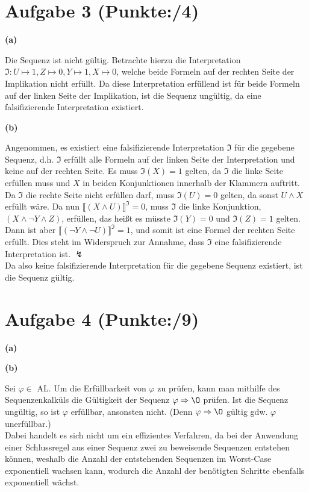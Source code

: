 \documentclass[11pt, a4paper]{article}
\newcommand{\pp}{4}
\newcommand{\ppp}{9}
\begin{document}
\section*{Aufgabe 3 (Punkte:\qquad/\pp)}
\textbf{(a)}
\begin{adjustwidth}{20pt}{20pt}
Die Sequenz ist nicht gültig. Betrachte hierzu die Interpretation $\mathfrak{I}:U \mapsto 1,Z \mapsto 0, Y \mapsto 1, X \mapsto 0$, welche beide Formeln auf der rechten Seite
der Implikation nicht erfüllt. Da diese Interpretation erfüllend ist für beide Formeln auf der linken Seite der Implikation, ist die Sequenz ungültig, da eine falsifizierende Interpretation
existiert.
\end{adjustwidth}
\textbf{(b)}
\begin{adjustwidth}{20pt}{20pt}
Angenommen, es existiert eine falsifizierende Interpretation $\mathfrak{I}$ für die gegebene Sequenz, d.h. $\mathfrak{I}$ erfüllt alle Formeln auf der linken Seite der Interpretation
und keine auf der rechten Seite. Es muss $\mathfrak{I}(X)=1$ gelten, da $\mathfrak{I}$ die linke Seite erfüllen muss und $X$ in beiden Konjunktionen innerhalb der Klammern auftritt.
Da $\mathfrak{I}$ die rechte Seite nicht erfüllen darf, muss $\mathfrak{I}(U)=0$ gelten, da sonst $U \wedge X$ erfüllt wäre. Da nun $\llbracket (X \wedge U)\rrbracket^\mathfrak{I}=0$,
muss $\mathfrak{I}$ die linke Konjunktion, $(X \wedge \neg Y \wedge Z)$, erfüllen, das heißt es müsste $\mathfrak{I}(Y)=0$ und $\mathfrak{I}(Z)=1$ gelten. Dann ist aber
$\llbracket (\neg Y \wedge \neg U)\rrbracket^\mathfrak{I}=1$, und somit ist eine Formel der rechten Seite erfüllt. Dies steht im Widerspruch zur Annahme, dass $\mathfrak{I}$ eine
falsifizierende Interpretation ist. $\lightning$\\
Da also keine falsifizierende Interpretation für die gegebene Sequenz existiert, ist die Sequenz gültig.
\end{adjustwidth}



\section*{Aufgabe 4 (Punkte:\qquad/\ppp)}
\textbf{(a)}
\begin{adjustwidth}{20pt}{20pt}

\end{adjustwidth}
\textbf{(b)}
\begin{adjustwidth}{20pt}{20pt}
Sei $\varphi \in $ AL. Um die Erfüllbarkeit von $\varphi$ zu prüfen, kann man mithilfe des Sequenzenkalküls die Gültigkeit der Sequenz $\varphi \Rightarrow \O$ prüfen. Ist die Sequenz
ungültig, so ist $\varphi$ erfüllbar, ansonsten nicht. (Denn $\varphi \Rightarrow \O$ gültig gdw. $\varphi$ unerfüllbar.)\\
Dabei handelt es sich nicht um ein effizientes Verfahren, da bei der Anwendung einer Schlussregel aus einer Sequenz zwei zu beweisende Sequenzen entstehen können, weshalb
die Anzahl der entstehenden Sequenzen im Worst-Case exponentiell wachsen kann, wodurch die Anzahl der benötigten Schritte ebenfalls exponentiell wächst.
\end{adjustwidth}
\end{document}
